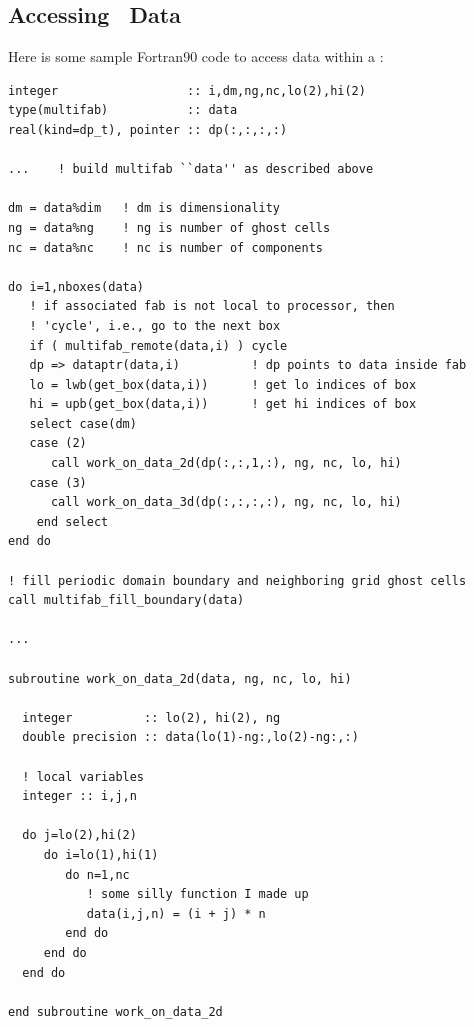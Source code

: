 \subsection{Accessing \MultiFab\ Data}
Here is some sample Fortran90 code to access data within a \MultiFab:
\begin{lstlisting}[backgroundcolor=\color{light-green}]
integer                  :: i,dm,ng,nc,lo(2),hi(2)
type(multifab)           :: data
real(kind=dp_t), pointer :: dp(:,:,:,:)

...    ! build multifab ``data'' as described above

dm = data%dim   ! dm is dimensionality
ng = data%ng    ! ng is number of ghost cells
nc = data%nc    ! nc is number of components

do i=1,nboxes(data)
   ! if associated fab is not local to processor, then
   ! 'cycle', i.e., go to the next box
   if ( multifab_remote(data,i) ) cycle
   dp => dataptr(data,i)          ! dp points to data inside fab
   lo = lwb(get_box(data,i))      ! get lo indices of box
   hi = upb(get_box(data,i))      ! get hi indices of box
   select case(dm)
   case (2)
      call work_on_data_2d(dp(:,:,1,:), ng, nc, lo, hi)
   case (3)
      call work_on_data_3d(dp(:,:,:,:), ng, nc, lo, hi)
    end select
end do

! fill periodic domain boundary and neighboring grid ghost cells
call multifab_fill_boundary(data)  

...

subroutine work_on_data_2d(data, ng, nc, lo, hi)

  integer          :: lo(2), hi(2), ng
  double precision :: data(lo(1)-ng:,lo(2)-ng:,:)

  ! local variables
  integer :: i,j,n

  do j=lo(2),hi(2)
     do i=lo(1),hi(1)
        do n=1,nc
           ! some silly function I made up
           data(i,j,n) = (i + j) * n
        end do
     end do
  end do

end subroutine work_on_data_2d
\end{lstlisting}

